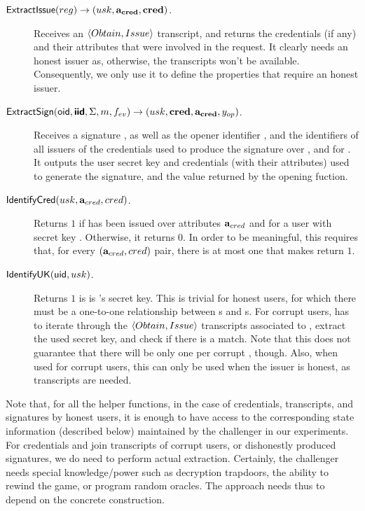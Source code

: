 \begin{description}
\item[$\mathsf{ExtractIssue}(reg) \rightarrow (usk,\mathbf{a}_{\mathbf{cred}},\mathbf{cred})$.]
  Receives an $\langle Obtain, Issue \rangle$ transcript, and returns the
  credentials (if any) and their attributes that were involved
  in the request. It clearly needs an honest issuer as, otherwise, the
  transcripts won't be available. Consequently, we only use it to define the
  properties that require an honest issuer.
\item[$\mathsf{ExtractSign}(\mathsf{oid},\boldsymbol{\mathsf{\mathsf{iid}}},\Sigma,m,f_{ev}) \rightarrow (usk,
  \mathbf{cred},\mathbf{a}_{\mathbf{cred}},y_{op})$.] Receives a signature \Sig,
  as well as the opener identifier \oid, and the identifiers of all issuers of
  the credentials used to produce the signature over \msg, and for \feval. It
  outputs the user secret key and credentials (with their attributes) used to
  generate the signature, and the value returned by the opening fuction.
\item[$\mathsf{IdentifyCred}(usk,\mathbf{a}_{cred},cred)$.] Returns $1$ if \cred has been
  issued over attributes $\mathbf{a}_{cred}$ and for a user with secret key \usk.
  Otherwise, it returns $0$. In order to be meaningful, this requires that,
  for every $(\mathbf{a}_{cred},cred)$ pair, there is at most one \usk that makes
  \IdentifyCred return $1$.
\item[$\mathsf{IdentifyUK}(\mathsf{uid},usk)$.] Returns $1$ is \usk is {\uid}'s secret key.
  This is trivial for honest users, for which there must be a one-to-one
  relationship between {\uid}s and {\usk}s. For corrupt users, \IdentifyUK has
  to iterate through the $\langle Obtain,Issue\rangle$ transcripts associated
  to \uid, extract the used secret key, and check if there is a match. Note that
  this does not guarantee that there will be only one \usk per corrupt \uid,
  though. Also, when used for corrupt users, this can only be used when the
  issuer is honest, as transcripts are needed. 
\end{description}

Note that, for all the helper functions, in the case of credentials, transcripts,
and signatures by honest users, it is enough to have access to the corresponding
state information (described below) maintained by the challenger in our
experiments. For credentials and join transcripts of corrupt users, or
dishonestly produced signatures, we do need to perform actual extraction.
Certainly, the challenger
needs special knowledge/power such as decryption trapdoors, the ability to
rewind the game, or program random oracles. The approach needs thus to depend on
the concrete construction. 

